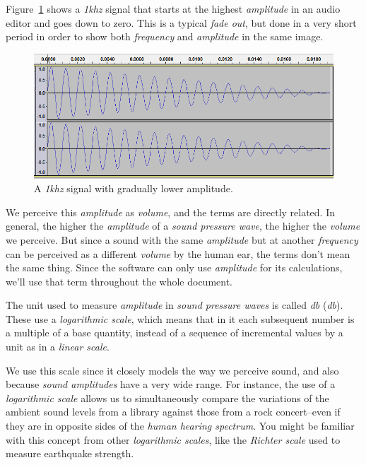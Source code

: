 \documentclass[10pt,a4paper]{report}
\newcommand{\define}[1]{\textit{\acrlong{#1}} (\textit{\acrshort{#1}})}
\newcommand{\khz}[1]{\textit{\mbox{#1\acrshort{khz}}}}
\begin{document}
Figure~\ref{fig:amplitude} shows a \khz{1} signal that starts at the highest \textit{amplitude} in an audio editor and goes down to zero. This is a typical \textit{fade out}, but done in a very short period in order to show both \textit{frequency} and \textit{amplitude} in the same image.

\begin{figure}[H]
	\centering
	\includegraphics[width=0.8\linewidth]{images/audio/amplitude.png}
	\caption[amplitude]{A \khz{1} signal with gradually lower amplitude.}
	\label{fig:amplitude}
\end{figure}

We perceive this \textit{amplitude} as \textit{volume}, and the terms are directly related. In general, the higher the \textit{amplitude} of a \textit{sound pressure wave}, the higher the \textit{volume} we perceive. But since a sound with the same  \textit{amplitude} but at another \textit{frequency} can be perceived as a different \textit{volume} by the human ear, the terms don't mean the same thing. Since the software can only use \textit{amplitude} for its calculations, we'll use that term throughout the whole document.

The unit used to measure \textit{amplitude} in \textit{sound pressure waves} is called \define{db}. These use a \textit{logarithmic scale}, which means that in it each subsequent number is a multiple of a base quantity, instead of a sequence of incremental values by a unit as in a \textit{linear scale}. 

We use this scale since it closely models the way we perceive sound, and also because \textit{sound amplitudes} have a very wide range. For instance, the use of a \textit{logarithmic scale} allows us to simultaneously compare the variations of the ambient sound levels from a library against those from a rock concert--even if they are in opposite sides of the \textit{human hearing spectrum}. You might be familiar with this concept from other \textit{logarithmic scales}, like the \textit{Richter scale} used to measure earthquake strength.
\end{document}
